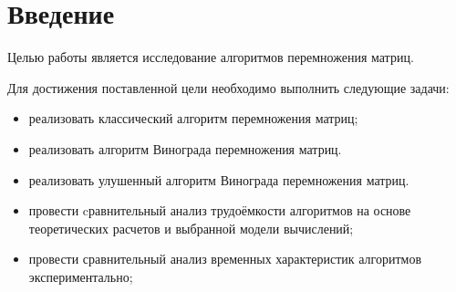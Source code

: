 \chapter*{Введение}


Целью работы является исследование алгоритмов перемножения матриц.

Для достижения поставленной цели необходимо выполнить следующие задачи:
\begin{itemize}
	\item реализовать классический алгоритм перемножения матриц;
	\item реализовать алгоритм Винограда перемножения матриц.
	\item реализовать улушенный алгоритм Винограда перемножения матриц.
	\item провести cравнительный анализ трудоёмкости алгоритмов на основе теоретических расчетов и выбранной модели вычислений;
	\item провести сравнительный анализ временных характеристик алгоритмов экспериментально;
\end{itemize}




